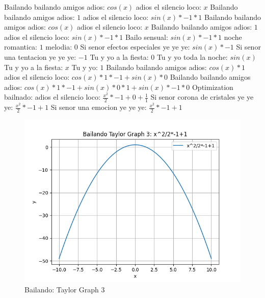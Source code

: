 \documentclass{article}
\begin{document}
Bailando bailando amigos adios: $cos(x)$  \newline adios el silencio loco: $x$ Bailando bailando amigos adios: $1$  \newline adios el silencio loco: $sin(x)*-1*1$ Bailando bailando amigos adios: $cos(x)$  \newline adios el silencio loco: $x$ Bailando bailando amigos adios: $1$  \newline adios el silencio loco: $sin(x)*-1*1$ Bailo sensual: $sin(x)*-1*1$ noche romantica: $1$ melodia: $0$  \newline Si senor efectos especiales ye ye ye: $sin(x)*-1$ Si senor una tentacion ye ye ye: $-1$ Tu y yo a la fiesta: $0$  \newline Tu y yo toda la noche: $sin(x)$  \newline Tu y yo a la fiesta: $x$ Tu y yo: $1$  \newline Bailando bailando amigos adios: $cos(x)*1$ adios el silencio loco: $cos(x)*1*-1+sin(x)*0$ Bailando bailando amigos adios: ${cos(x)*1*-1+sin(x)*0}*1+sin(x)*-1*0$  \newline \newline Optimization bailnado: \newline adios el silencio loco: $\frac{x^2}{2}*-1+0+\frac{1}{1}$  \newline Si senor corona de cristales ye ye ye: $\frac{x^2}{2}*-1+1$  \newline Si senor una emocion ye ye ye: $\frac{x^2}{2}*-1+1$  \newline \begin{figure}
\centering
\includegraphics[width=0.8\linewidth]{Bailando Taylor Graph 3.png}
\caption{Bailando: Taylor Graph 3}
\label{fig:my_image}
\end{figure}
\end{document}
